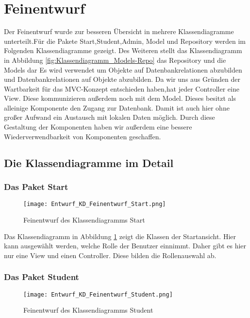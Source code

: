 \documentclass[a4paper,10pt]{article}
\begin{document}
  \newpage
\section{Feinentwurf}
Der Feinentwurf wurde zur besseren Übersicht in mehrere Klassendiagramme unterteilt.F\"ur die Pakete Start,Student,Admin, Model und Repository werden im Folgenden Klassendiagramme gezeigt.
Des Weiteren stellt das Klassendiagramm in Abbildung \ref{fig:Klassendiagramm_Models-Repo} das Repository und die Models dar  Es wird verwendet um Objekte auf Datenbankrelationen abzubilden und Datenbankrelationen auf Objekte abzubilden. Da wir uns aus Gründen der Wartbarkeit für das MVC-Konzept entschieden haben,hat jeder Controller eine View.
Diese kommunizieren außerdem noch mit dem Model. Dieses besitzt als alleinige Komponente den Zugang zur Datenbank. Damit ist auch hier ohne großer Aufwand ein Austausch mit lokalen Daten möglich.
Durch diese Gestaltung der Komponenten haben wir außerdem eine bessere Wiederverwendbarkeit von Komponenten geschaffen. 

 \subsection{Die Klassendiagramme im Detail}
 \subsubsection{Das Paket Start}
 
 \begin{figure}
  \texttt{[image: Entwurf\_KD\_Feinentwurf\_Start.png]}
  \label{fig:Klassendiagramm_Start}
  \caption{Feinentwurf des Klassendiagramms Start}
 \end{figure} 
 
 Das Klassendiagramm in Abbildung \ref{fig:Klassendiagramm_Start} zeigt die Klassen der Startansicht. Hier kann ausgewählt werden, welche Rolle der Benutzer einnimmt. 
 Daher gibt es hier nur eine View und einen Controller. Diese bilden die Rollenauswahl ab.
 \subsubsection{Das Paket Student}
 
 \begin{figure}
\texttt{[image: Entwurf\_KD\_Feinentwurf\_Student.png]}
\label{fig:Klassendiagramm_Student}
\caption{Feinentwurf des Klassendiagramms Student}
 \end{figure} 
\end{document}
